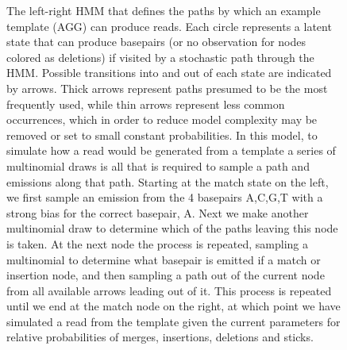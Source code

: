 \documentclass[fleqn,10pt]{SelfArx} %
\begin{document}
\begin{figure}[ht] %
		\caption{The left-right HMM that defines the paths by which an example template (AGG) can produce reads.  Each circle represents a latent state that can produce basepairs (or no observation for nodes colored as deletions) if visited by a stochastic path through the HMM.  Possible transitions into and out of each state are indicated by arrows.  Thick arrows represent paths presumed to be the most frequently used, while thin arrows represent less common occurrences, which in order to reduce model complexity may be removed or set to small constant probabilities.  In this model, to simulate how a read would be generated from a template a series of multinomial draws is all that is required to sample a path and emissions along that path.  Starting at the match state on the left, we first sample an emission from the 4 basepairs A,C,G,T with a strong bias for the correct basepair, A.  Next we make another multinomial draw to determine which of the paths leaving this node is taken.  At the next node the process is repeated, sampling a multinomial to determine what basepair is emitted if a match or insertion node, and then sampling a path out of the current node from all available arrows leading out of it.  This process is repeated until we end at the match node on the right, at which point we have simulated a read from the template given the current parameters for relative probabilities of merges, insertions, deletions and sticks. }				
\end{figure}
\end{document}
